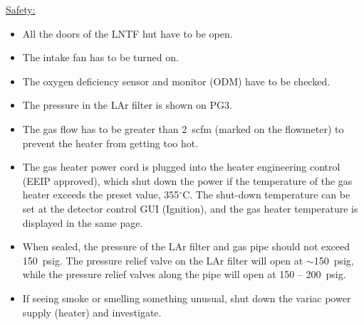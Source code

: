 \documentclass[letterpaper,11pt]{article}
\newcommand{\dC}        {$^\circ$C}
\begin{document}
\underline{Safety:}
\begin{itemize}
\setlength\itemsep{-0.2em}
\item All the doors of the LNTF hut have to be open.
\item The intake fan has to be turned on.
\item The oxygen deficiency sensor and monitor (ODM) have to be checked.
\item The pressure in the LAr filter is shown on PG3.
\item The gas flow has to be greater than 2~scfm (marked on the flowmeter) to prevent the heater 
from getting too hot.
\item The gas heater power cord is plugged into the heater engineering control (EEIP approved), 
which shut down the power if the temperature
of the gas heater exceeds the preset value, 355{\dC}.  
The shut-down temperature can be set at the detector control GUI (Ignition),
and the gas heater temperature is displayed in the same page.
\item When sealed, the pressure of the LAr filter and gas pipe should not exceed 150~psig.
The pressure relief valve on the LAr filter will open at $\sim$150~psig,
while the pressure relief valves along the pipe will open at 150 -- 200~psig.
\item If seeing smoke or smelling something unusual, shut down the variac power supply (heater) and investigate.
\end{itemize}
\end{document}
